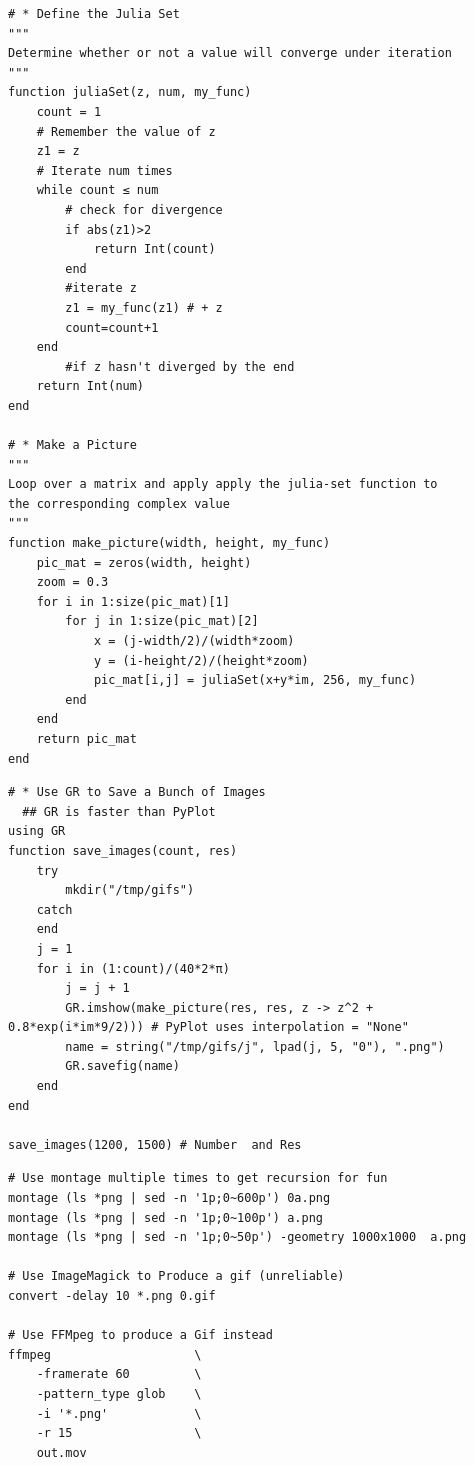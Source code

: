 \documentclass[11pt]{article}
\begin{document}
\begin{listing}[htbp]
\begin{verbatim}
# * Define the Julia Set
"""
Determine whether or not a value will converge under iteration
"""
function juliaSet(z, num, my_func)
    count = 1
    # Remember the value of z
    z1 = z
    # Iterate num times
    while count ≤ num
        # check for divergence
        if abs(z1)>2
            return Int(count)
        end
        #iterate z
        z1 = my_func(z1) # + z
        count=count+1
    end
        #if z hasn't diverged by the end
    return Int(num)
end

# * Make a Picture
"""
Loop over a matrix and apply apply the julia-set function to
the corresponding complex value
"""
function make_picture(width, height, my_func)
    pic_mat = zeros(width, height)
    zoom = 0.3
    for i in 1:size(pic_mat)[1]
        for j in 1:size(pic_mat)[2]
            x = (j-width/2)/(width*zoom)
            y = (i-height/2)/(height*zoom)
            pic_mat[i,j] = juliaSet(x+y*im, 256, my_func)
        end
    end
    return pic_mat
end

\end{verbatim}
\caption{\label{julia-gen-fracs}Produce a series of fractals using julia}
\end{listing}

\begin{listing}[htbp]
\begin{verbatim}
# * Use GR to Save a Bunch of Images
  ## GR is faster than PyPlot
using GR
function save_images(count, res)
    try
        mkdir("/tmp/gifs")
    catch
    end
    j = 1
    for i in (1:count)/(40*2*π)
        j = j + 1
        GR.imshow(make_picture(res, res, z -> z^2 + 0.8*exp(i*im*9/2))) # PyPlot uses interpolation = "None"
        name = string("/tmp/gifs/j", lpad(j, 5, "0"), ".png")
        GR.savefig(name)
    end
end

save_images(1200, 1500) # Number  and Res
\end{verbatim}
\caption{\label{GR-save}Generate and save the images with GR}
\end{listing}

\begin{listing}[htbp]
\begin{verbatim}
# Use montage multiple times to get recursion for fun
montage (ls *png | sed -n '1p;0~600p') 0a.png
montage (ls *png | sed -n '1p;0~100p') a.png
montage (ls *png | sed -n '1p;0~50p') -geometry 1000x1000  a.png

# Use ImageMagick to Produce a gif (unreliable)
convert -delay 10 *.png 0.gif

# Use FFMpeg to produce a Gif instead
ffmpeg                    \
    -framerate 60         \
    -pattern_type glob    \
    -i '*.png'            \
    -r 15                 \
    out.mov


\end{verbatim}
\caption{\label{bash-frac-join}Using \texttt{bash}, \texttt{ffmpeg} and \emph{ImageMagick} to combine the images and produce an animation.}
\end{listing}
\end{document}
